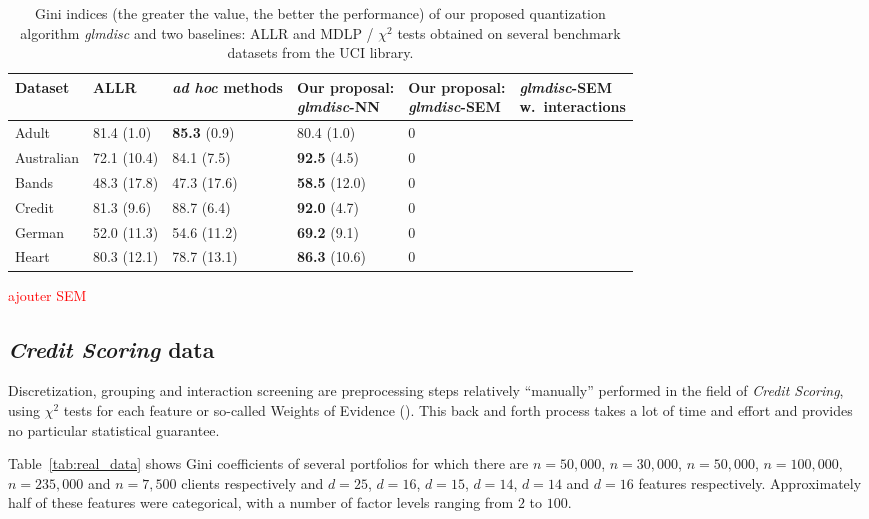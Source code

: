 \begin{table}
    \centering
        \caption{Gini indices (the greater the value, the better the performance) of our proposed quantization algorithm \textit{glmdisc} and two baselines: ALLR and MDLP / $\chi^2$ tests obtained on several benchmark datasets from the UCI library.}
    \label{tab:banchmark}
\begin{small}
\begin{tabular}{llllll}
Dataset & ALLR & \textit{ad hoc} methods & \makecell{Our proposal:\\ \textit{glmdisc}-NN} & \makecell{Our proposal:\\ \textit{glmdisc}-SEM} & \makecell{\textit{glmdisc}-SEM\\ w.\ interactions} \\
\hline
Adult & 81.4 (1.0) & \textbf{85.3} (0.9) & 80.4 (1.0) & 0 & \\
Australian & 72.1 (10.4) & 84.1 (7.5) & \textbf{92.5} (4.5) & 0 & \\
Bands & 48.3 (17.8) & 47.3 (17.6) & \textbf{58.5} (12.0) & 0 & \\
Credit & 81.3 (9.6) & 88.7 (6.4) & \textbf{92.0} (4.7) & 0 & \\
German & 52.0 (11.3) & 54.6 (11.2) & \textbf{69.2} (9.1) & 0 & \\
Heart & 80.3 (12.1) & 78.7 (13.1) & \textbf{86.3} (10.6) & 0 & 
\end{tabular}
\end{small}
\end{table}


\textcolor{red}{ajouter SEM}

\subsection{\textit{Credit Scoring} data}


Discretization, grouping and interaction screening are preprocessing steps relatively ``manually'' performed in the field of \textit{Credit Scoring}, using $\chi^2$ tests for each feature or so-called Weights of Evidence (\cite{zeng2014necessary}). This back and forth process takes a lot of time and effort and provides no particular statistical guarantee.

Table~\ref{tab:real_data} shows Gini coefficients of several portfolios for which there are $n=50,000$, $n=30,000$, $n=50,000$, $n=100,000$, $n=235,000$ and $n=7,500$ clients respectively and $d=25$, $d=16$, $d=15$, $d=14$, $d=14$ and $d=16$ features respectively. Approximately half of these features were categorical, with a number of factor levels ranging from $2$ to $100$. 

